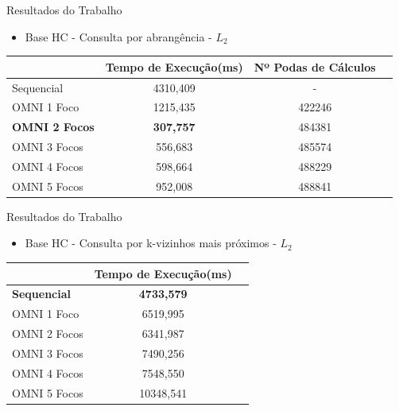 \documentclass{beamer}
\begin{document}
\begin{frame}{Resultados do Trabalho}
 \begin{itemize}
  \item Base HC - Consulta por abrangência - $L_2$
 \end{itemize}
  
  \begin{table}[H]
    \centering
   \begin{tabular}{l c c c}
            &Tempo de Execução(ms)&Nº Podas de Cálculos\\ \hline
            Sequencial & 4310,409 & - \\
            OMNI 1 Foco & 1215,435 & 422246 \\
            \textbf{OMNI 2 Focos} & \textbf{307,757} & 484381 \\
            OMNI 3 Focos & 556,683 & 485574 \\
            OMNI 4 Focos & 598,664 & 488229 \\
            OMNI 5 Focos & 952,008 & 488841 \\ \hline
    \end{tabular}
\end{table}
  
\end{frame}

\begin{frame}{Resultados do Trabalho}
 \begin{itemize}
  \item Base HC - Consulta por k-vizinhos mais próximos - $L_2$
 \end{itemize}
  
  \begin{table}[H]
    \centering
   \begin{tabular}{l c c}
            &Tempo de Execução(ms)\\ \hline
            \textbf{Sequencial} & \textbf{4733,579}  \\
            OMNI 1 Foco & 6519,995  \\
            OMNI 2 Focos & 6341,987  \\
            OMNI 3 Focos & 7490,256 \\
            OMNI 4 Focos & 7548,550 \\
            OMNI 5 Focos & 10348,541 \\ \hline
    \end{tabular}
\end{table}
  
\end{frame}
\end{document}
